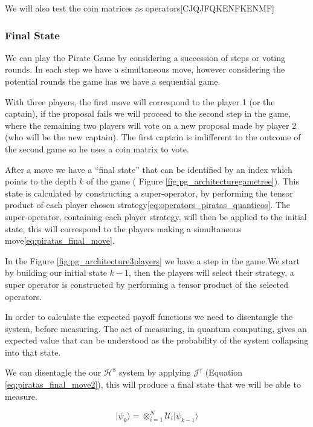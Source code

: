 We will also test the coin matrices as operators[CJQJFQKENFKENMF]



\subsubsection{Final State}
\label{subsec:pirates_finalstate}

We can play the Pirate Game by considering a succession of steps or voting rounds. In each step we have a simultaneous move, however considering the potential rounds the game has we have a sequential game. 

With three players, the first move will correspond to the player 1 (or the captain), if the proposal fails we will proceed to the second step in the game, where the remaining two players will vote on a new proposal made by player 2 (who will be the new captain). The first captain is indifferent to the outcome of the second game so he uses a coin matrix to vote.

After a move we have a ``final state'' that can be identified by an index which points to the depth $k$ of the game ( Figure \ref{fig:pg_architecturegametree}). This state is calculated by constructing a super-operator, by performing the tensor product of each player chosen strategy\ref{eq:operators_piratas_quanticos}. The super-operator, containing each player strategy, will then be applied to the initial state, this will correspond to the players making a simultaneous move\ref{eq:piratas_final_move}.

In the Figure \ref{fig:pg_architecture3players} we have a step in the game.We start by building our initial state $k-1$, then the players will select their strategy, a super operator is constructed by performing a tensor product of the selected operators. 

In order to calculate the expected payoff functions we need to disentangle the system, before measuring. The act of measuring, in quantum computing, gives an expected value that can be understood as the probability of the system collapsing into that state. 

We can disentagle the our $\mathcal{H}^{8}$ system by applying $\mathcal{J}^{\dagger}$ (Equation \ref{eq:piratas_final_move2}), this will produce a final state that we will be able to measure. 

\begin{equation}
\vert\psi_{k}\rangle=\otimes_{i=1}^{N} \mathcal{U}_{i}\vert\psi_{k-1}\rangle
\label{eq:piratas_final_move}
\end{equation}

